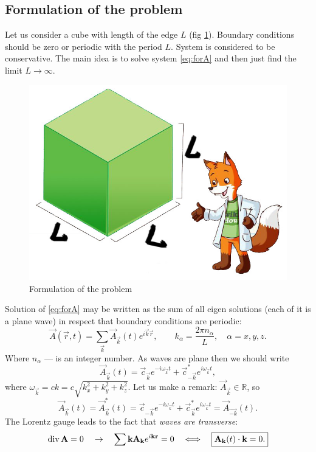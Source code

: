 	\subsection{Formulation of the problem}
	
	Let us consider a cube with length of the edge $L$ (fig \ref{fig:cube}). Boundary conditions should be zero or periodic with the period $L$. System is considered to be conservative. The main idea is to solve system \eqref{eq:forA} and then just find the limit $L \to \infty$.
	
	\begin{figure}
		\centering
		\includegraphics[width=0.5\linewidth]{fig/L1/cube}
		\caption{Formulation of the problem}
		\label{fig:cube}
	\end{figure}

	Solution of \eqref{eq:forA} may be written as the sum of all eigen solutions (each of it is a plane wave) in respect that boundary conditions are periodic:
	\begin{equation}
		\vec{A}(\vec{r},t) = \sum_{\vec{k}} \vec{A}_{\vec{k}}(t) e^{i \vec{k} \vec{r}}, \qquad k_{\alpha} = \frac{2 \pi n_{\alpha}}{L}, \quad \alpha = x,y,z.
	\end{equation}
Where $n_{\alpha}$ --- is an integer number.
As waves are plane then we should write
	\begin{equation}
		\vec{A}_{\vec{k}}(t) = \vec{c}_{\vec{k}} e^{-i \omega_{\vec{k}}t} + \vec{c}_{-\vec{k}}^* e^{i \omega_{\vec{k}}t},
	\end{equation}
	where $\omega_{\vec{k}} = c k = c\sqrt{k_x^2 + k_y^2 + k_z^2}$.
Let us make a remark: $\vec{A}_{\vec{k}} \in \mathbb{R}$, so
\begin{equation}\label{kminsk}
		\vec{A}_{\vec{k}}(t)=\vec{A}_{\vec{k}}^*(t) = \vec{c}_{-\vec{k}} e^{-i \omega_{\vec{k}}t}+ \vec{c}_{\vec{k}}^* e^{i \omega_{\vec{k}}t}=\vec{A}_{\vec{-k}}(t).
	\end{equation}
	The Lorentz gauge leads to the fact that \textit{waves are transverse}:
	\begin{equation}
		\operatorname{div} \mathbf{A} = 0 \quad \to \quad \sum \mathbf{k} \mathbf{A}_{\mathbf{k}} e^{i \mathbf{k} \mathbf{r}} = 0 \quad \Longleftrightarrow \quad \boxed{\mathbf{A}_{\mathbf{k}}(t) \cdot \mathbf{k} = 0.}
	\end{equation}
	
